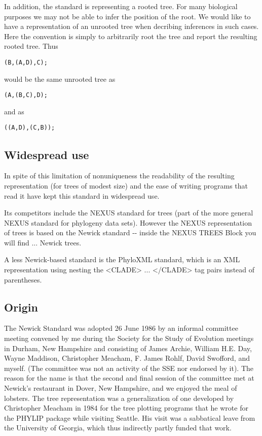 In addition, the standard is representing a rooted tree. For many
biological purposes we may not be able to infer the position of the
root. We would like to have a representation of an unrooted tree when
decribing inferences in such cases. Here the convention is simply to
arbitrarily root the tree and report the resulting rooted tree. Thus

\bigskip

\texttt{(B,(A,D),C);}

\bigskip

would be the same unrooted tree as

\bigskip

\texttt{(A,(B,C),D);}

\bigskip

and as

\bigskip

\texttt{((A,D),(C,B));}

\hypertarget{widespread-use}{%
\subsection*{Widespread use}\label{widespread-use}}

In spite of this limitation of nonuniqueness the readability of the
resulting representation (for trees of modest size) and the ease of
writing programs that read it have kept this standard in widespread use.

\bigskip

Its competitors include the
NEXUS standard for trees
(part of the more general NEXUS standard for phylogeny data sets).
However the NEXUS representation of trees is based on the Newick
standard -\/- inside the NEXUS TREES Block you will find ... Newick
trees.

\bigskip

A less Newick-based standard is the
PhyloXML standard, which
is an XML representation using nesting the \textless CLADE\textgreater{}
... \textless/CLADE\textgreater{} tag pairs instead of parentheses.

\hypertarget{origin}{%
\subsection*{Origin}\label{origin}}

The Newick Standard was adopted 26 June 1986 by an informal committee
meeting convened by me during the
Society for the Study of
Evolution meetings in Durham, New Hampshire and consisting of
James Archie,
William H.E.
Day,
Wayne
Maddison, Christopher
Meacham, F. James Rohlf,
David
Swofford, and
myself. (The
committee was not an activity of the SSE nor endorsed by it). The reason
for the name is that the second and final session of the committee met
at Newick's restaurant in Dover, New
Hampshire, and we enjoyed the meal of lobsters. The tree representation
was a generalization of one developed by Christopher Meacham in 1984 for
the tree plotting programs that he wrote for the
PHYLIP package
while visiting Seattle. His visit was a sabbatical leave from the
University of Georgia, which thus indirectly partly funded that work.

